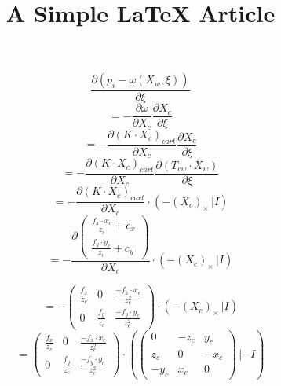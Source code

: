 \documentclass{article}
\begin{document}
\title{A Simple LaTeX Article}
$$ \frac{\partial (p_i-\omega(X_w,\xi))}{\partial  \xi }$$
$$=- \frac{\partial \omega }{\partial X_c }  \frac{\partial X_c }{\partial \xi}$$
$$=- \frac{\partial (K\cdot X_c)_{cart}}{\partial X_c }  \frac{\partial X_c }{\partial \xi}$$
$$=-\frac{\partial (K\cdot X_c)_{cart}}{\partial X_c }\frac{\partial (T_{cw}\cdot X_w) }{\partial \xi}$$
$$=-\frac{\partial (K\cdot X_c)_{cart}}{\partial X_c }\cdot(-(X_c)_\times\,|I )$$
$$=-\frac{\partial \begin{pmatrix}  \frac{f_x \cdot x_c}{z_c}+c_x  \\  \frac{f_y \cdot y_c}{z_c}+c_y   \end{pmatrix}}{\partial X_c }\cdot(-(X_c)_\times\,|I )$$


$$=
-
\begin{pmatrix}  \frac{f_x}{z_c}&0&\frac{-f_x\cdot x_c}{z_c^2}  \\ 0& \frac{f_y }{z_c}  & \frac{-f_y\cdot y_c}{z_c^2} \end{pmatrix}\cdot(-(X_c)_\times\,|I )$$
$$=
\begin{pmatrix}  \frac{f_x}{z_c}&0&\frac{-f_x\cdot x_c}{z_c^2}  \\ 0& \frac{f_y }{z_c}  & \frac{-f_y\cdot y_c}{z_c^2} \end{pmatrix}\cdot(\begin{pmatrix} 0&-z_c&y_c\\z_c&0&-x_c\\-y_c&x_c&0\end{pmatrix}\,|-I )$$
\end{document}
